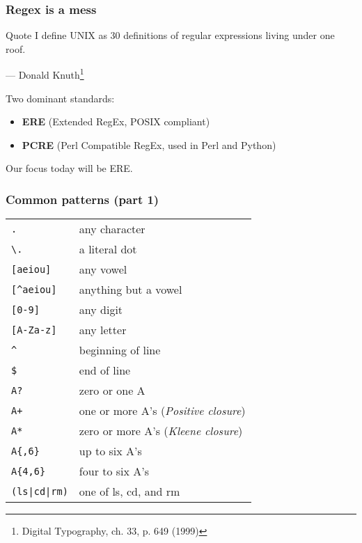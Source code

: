 \begin{frame}
\frametitle{Regex is a mess}
\begin{block}{Quote}
I define UNIX as 30 definitions of regular expressions living under one roof.
\begin{flushright}
    — Donald Knuth\footnote{Digital Typography, ch. 33, p. 649 (1999)}
\end{flushright}
\end{block}

Two dominant standards:
\begin{itemize}
    \item \textbf{ERE} (Extended RegEx, POSIX compliant)
    \item \textbf{PCRE} (Perl Compatible RegEx, used in Perl and Python)
\end{itemize}
Our focus today will be ERE.
\end{frame}

\begin{frame}[fragile]
\frametitle{Common patterns (part 1)}
\begin{table}
    \centering
    \begin{tabular}{ll}
        \verb|.|            & any character \\
        \verb|\.|           & a literal dot \\
        \verb|[aeiou]|      & any vowel \\
        \verb|[^aeiou]|     & anything but a vowel \\
        \verb|[0-9]|        & any digit \\
        \verb|[A-Za-z]|     & any letter \\
        \verb|^|            & beginning of line \\
        \verb|$|            & end of line \\
        \verb|A?|           & zero or one A \\
        \verb|A+|           & one or more A's (\emph{Positive closure}) \\
        \verb|A*|           & zero or more A's (\emph{Kleene closure}) \\
        \verb|A{,6}|        & up to six A's \\
        \verb|A{4,6}|       & four to six A's \\
        \verb!(ls|cd|rm)!   & one of ls, cd, and rm
    \end{tabular}
\end{table}
\end{frame}

